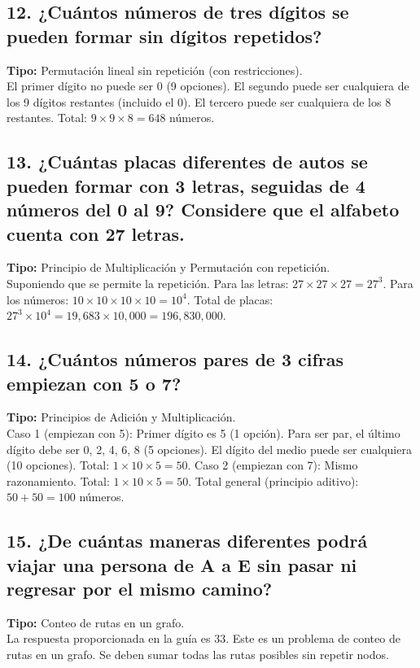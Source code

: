 \documentclass[11pt]{article}
\begin{document}
    \subsection*{12. ¿Cuántos números de tres dígitos se pueden formar sin dígitos repetidos?}
    \textbf{Tipo:} Permutación lineal sin repetición (con restricciones). \\
    El primer dígito no puede ser 0 (9 opciones). El segundo puede ser cualquiera de los 9 dígitos restantes (incluido el 0). El tercero puede ser cualquiera de los 8 restantes. Total: $9 \times 9 \times 8 = 648$ números.

    \subsection*{13. ¿Cuántas placas diferentes de autos se pueden formar con 3 letras, seguidas de 4 números del 0 al 9? Considere que el alfabeto cuenta con 27 letras.}
    \textbf{Tipo:} Principio de Multiplicación y Permutación con repetición. \\
    Suponiendo que se permite la repetición. Para las letras: $27 \times 27 \times 27 = 27^3$. Para los números: $10 \times 10 \times 10 \times 10 = 10^4$.
    Total de placas: $27^3 \times 10^4 = 19,683 \times 10,000 = 196,830,000$.

    \subsection*{14. ¿Cuántos números pares de 3 cifras empiezan con 5 o 7?}
    \textbf{Tipo:} Principios de Adición y Multiplicación. \\
    Caso 1 (empiezan con 5): Primer dígito es 5 (1 opción). Para ser par, el último dígito debe ser 0, 2, 4, 6, 8 (5 opciones). El dígito del medio puede ser cualquiera (10 opciones). Total: $1 \times 10 \times 5 = 50$.
    Caso 2 (empiezan con 7): Mismo razonamiento. Total: $1 \times 10 \times 5 = 50$.
    Total general (principio aditivo): $50 + 50 = 100$ números.

    \subsection*{15. ¿De cuántas maneras diferentes podrá viajar una persona de A a E sin pasar ni regresar por el mismo camino?}
    \textbf{Tipo:} Conteo de rutas en un grafo. \\
    La respuesta proporcionada en la guía es 33. Este es un problema de conteo de rutas en un grafo. Se deben sumar todas las rutas posibles sin repetir nodos.
\end{document}
